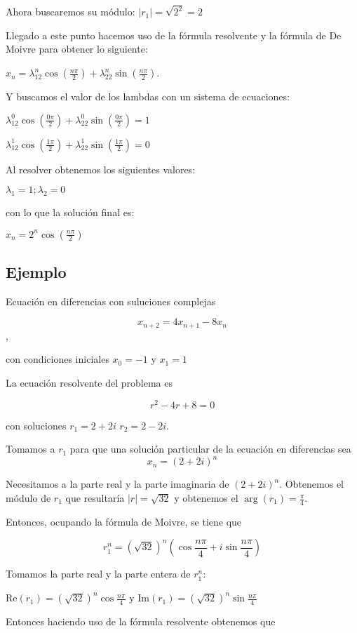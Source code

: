\documentclass{report}
\begin{document}
Ahora buscaremos su módulo: $|r_{1}|=\sqrt{2^2}=2$

Llegado a este punto hacemos uso de la fórmula resolvente y la fórmula de De Moivre para obtener lo siguiente:

$x_n=\lambda_12^n\cos(\frac{n\pi}{2})+\lambda_22^n\sin(\frac{n\pi}{2})$.


Y buscamos el valor de los lambdas con un sistema de ecuaciones:

$\lambda_12^0\cos(\frac{0\pi}{2})+\lambda_22^0\sin(\frac{0\pi}{2})=1$

$\lambda_12^1\cos(\frac{1\pi}{2})+\lambda_22^1\sin(\frac{1\pi}{2})=0$

Al resolver obtenemos los siguientes valores:

$\lambda_1=1;\lambda_2=0$

con lo que la solución final es:

$x_n=2^n\cos(\frac{n\pi}{2})$
\bigskip
\bigskip
\subsection{Ejemplo}

Ecuación en diferencias con suluciones complejas

$$x_{n+2}=4x_{n+1}-8x_{n}$$,

con condiciones iniciales $x_{0}=-1$ y $x_{1}=1$

 La ecuación resolvente del problema es

 $$r^2-4r+8=0$$

 con soluciones $r_{1}=2+2i$ $r_{2}=2-2i$.

\bigskip

 Tomamos a $r_{1}$ para que una solución particular de la ecuación en diferencias sea $$x_{n}=(2+2i)^n$$

Necesitamos a la parte real y la parte imaginaria de $(2+2i)^n$. Obtenemos el módulo de $r_{1}$ que resultaría $|r|= \sqrt{32}$ y obtenemos el $\arg(r_{1})=\frac{\pi}{4}$.

Entonces, ocupando la fórmula de Moivre, se tiene que

$$r_{1}^n=(\sqrt{32})^n(\cos{\frac{n\pi}{4}}+i\sin{\frac{n\pi}{4}})$$


Tomamos la parte real y la parte entera de $r_{1}^n$:

$\mathrm{Re}(r_{1})=(\sqrt{32})^n\cos{\frac{n\pi}{4}}$ y $\mathrm{Im}(r_{1})=(\sqrt{32})^n\sin{\frac{n\pi}{4}}$

  Entonces haciendo uso de la fórmula resolvente obtenemos que
\end{document}
